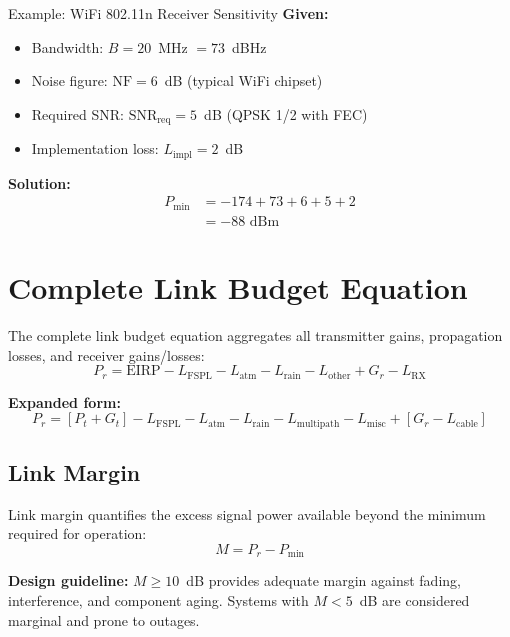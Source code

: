 \begin{calloutbox}{Example: WiFi 802.11n Receiver Sensitivity}
\textbf{Given:}
\begin{itemize}
\item Bandwidth: $B = 20$~MHz $= 73$~dBHz
\item Noise figure: $\text{NF} = 6$~dB (typical WiFi chipset)
\item Required SNR: $\text{SNR}_{\text{req}} = 5$~dB (QPSK 1/2 with FEC)
\item Implementation loss: $L_{\text{impl}} = 2$~dB
\end{itemize}

\textbf{Solution:}
\begin{align*}
P_{\text{min}} &= -174 + 73 + 6 + 5 + 2 \\
&= -88\text{~dBm}
\end{align*}
\end{calloutbox}

\section{Complete Link Budget Equation}

The complete link budget equation aggregates all transmitter gains, propagation losses, and receiver gains/losses:
\begin{equation}
P_r = \text{EIRP} - L_{\text{FSPL}} - L_{\text{atm}} - L_{\text{rain}} - L_{\text{other}} + G_r - L_{\text{RX}}
\label{eq:link-budget-complete}
\end{equation}

\textbf{Expanded form:}
\begin{equation}
P_r = [P_t + G_t] - L_{\text{FSPL}} - L_{\text{atm}} - L_{\text{rain}} - L_{\text{multipath}} - L_{\text{misc}} + [G_r - L_{\text{cable}}]
\label{eq:link-budget-expanded}
\end{equation}

\subsection{Link Margin}

Link margin quantifies the excess signal power available beyond the minimum required for operation:
\begin{equation}
M = P_r - P_{\text{min}}
\label{eq:margin-definition}
\end{equation}

\begin{keyconcept}
\textbf{Design guideline:} $M \geq 10$~dB provides adequate margin against fading, interference, and component aging. Systems with $M < 5$~dB are considered marginal and prone to outages.
\end{keyconcept}

